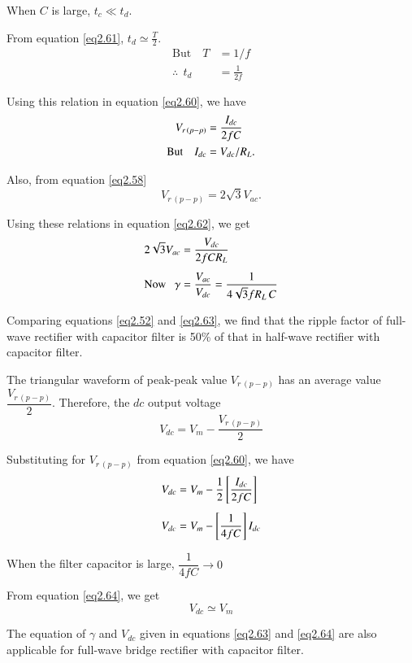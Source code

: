 When $C$ is large, $t_c \ll t_d$.

From equation \eqref{eq2.61}, $t_d \simeq \frac{T}{2}$.
\begin{align*}
\text{But} \quad T & = 1/f\\
\therefore ~~ t_d & = \frac{1}{2f}
\end{align*}

Using this relation in equation \eqref{eq2.60}, we have
\begin{align}
V_{r\,(p-p)} & = \frac{I_{dc}}{2 f C} \label{eq2.62}\\
\text{But } ~ ~~ I_{dc} & = V_{dc} / R_L. \notag
\end{align}

Also, from equation \eqref{eq2.58}
$$
V_{r\,(p-p)} = 2 \sqrt{3} V_{ac}.
$$

Using these relations in equation \eqref{eq2.62}, we get
\begin{align}
2 \sqrt{3} V_{ac} & = \frac{V_{dc}}{2 f C R_L}\notag\\[4pt]
\text{Now} ~~~ \gamma &= \frac{V_{ac}}{V_{dc}} = \frac{1}{4 \sqrt{3} f
  R_L\, C}\label{eq2.63}
\end{align}

Comparing equations \eqref{eq2.52} and \eqref{eq2.63}, we find that
the ripple factor of full-wave rectifier with capacitor filter is 50\%
of that in half-wave rectifier with capacitor filter.

\medskip
{}

The triangular waveform of peak-peak value $V_{r\,(p-p)}$ has an average
value $\dfrac{V_{r\,(p-p)}}{2}$. Therefore, the $dc$ output voltage
$$
V_{dc} = V_m - \frac{V_{r\,(p-p)}}{2}
$$

Substituting for $V_{r\,(p-p)}$ from equation \eqref{eq2.60}, we have
\begin{align}
V_{dc} & = V_m - \frac{1}{2} \left[\frac{I_{dc}}{2 f C} \right]
\notag\\[4pt]
V_{dc} & = V_m - \left[\frac{1}{4 f C} \right] I_{dc} \label{eq2.64}
\end{align}

When the filter capacitor is large, $\dfrac{1}{4 f C} \to 0$

From equation \eqref{eq2.64}, we get
\begin{equation}
V_{dc} \simeq V_m   \label{eq2.65}
\end{equation}

\medskip
{}
The equation of $\gamma$ and $V_{dc}$ given in equations
\eqref{eq2.63} and \eqref{eq2.64} are also applicable for full-wave
bridge rectifier with capacitor filter. 

